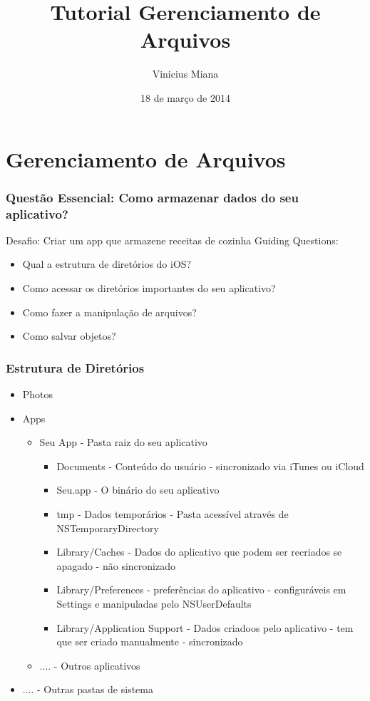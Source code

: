 \documentclass[serif,mathserif]{beamer}
\author[Vinicius Miana]{Vinicius Miana}
\title[Short Title\hspace{2em}\insertframenumber/\inserttotalframenumber]{Tutorial Gerenciamento de Arquivos}
\date{18 de março de 2014} %
\institute{Universidade Presbiteriana Mackenzie}
\begin{document}

\maketitle

\section{Gerenciamento de Arquivos}  


\begin{frame}
  \frametitle{Questão Essencial: Como armazenar dados do seu aplicativo? }
   Desafio: Criar um app que armazene receitas de cozinha
   Guiding Questions:
  \begin{itemize}
  \item Qual a estrutura de diretórios do iOS? 
  \item Como acessar os diretórios importantes do seu aplicativo?
  \item Como fazer a manipulação de arquivos?
  \item Como salvar objetos?
  \end{itemize}
\end{frame}


\begin{frame}
  \frametitle{Estrutura de Diretórios}
  \begin{itemize}
  \item Photos
  \item Apps
    \begin{itemize}
      \item Seu App - Pasta raiz do seu aplicativo
        \begin{itemize}
          \item Documents - Conteúdo do usuário - sincronizado via iTunes ou iCloud
          \item Seu.app - O binário do seu aplicativo
          \item tmp - Dados temporários - Pasta acessível através de NSTemporaryDirectory  
          \item Library/Caches - Dados do aplicativo que podem ser recriados se apagado - não sincronizado
          \item Library/Preferences - preferências do aplicativo - configuráveis em Settings e manipuladas pelo NSUserDefaults
          \item Library/Application Support - Dados criadoos pelo aplicativo - tem que ser criado manualmente - sincronizado
        \end{itemize}  
      \item .... - Outros aplicativos
    \end{itemize}    
  \item .... - Outras pastas de sistema
  \end{itemize}
\end{frame}
\end{document}
